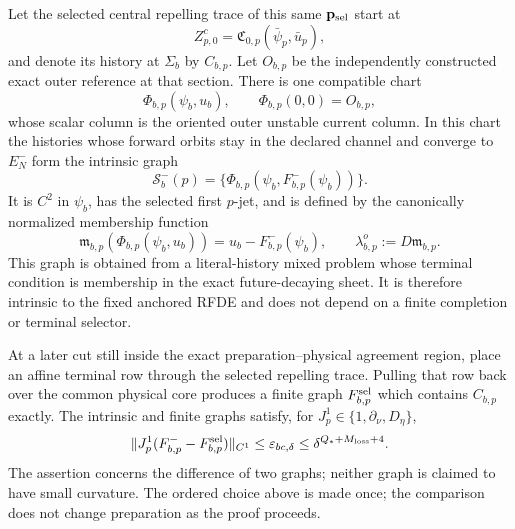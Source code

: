 \begin{proposition}
Let the selected central repelling trace of this same
\(\mathbf p_{\rm sel}\) start at
\begin{equation}
 Z^{c}_{p,0}
 =\mathfrak C_{0,p}(\bar\psi_p,\bar u_p),             \label{eq:anchor-reference-central-data}
\end{equation}
and denote its history at \(\Sigma_b\) by \(C_{b,p}\).  Let \(O_{b,p}\)
be the independently constructed exact outer reference at that section.
There is one compatible chart
\[
 \Phi_{b,p}(\psi_b,u_b),\qquad \Phi_{b,p}(0,0)=O_{b,p},
\]
whose scalar column is the oriented outer unstable current column.  In this
chart the histories whose forward orbits stay in the declared channel and
converge to \(E_N^-\) form the intrinsic graph
\begin{equation}
 \mathcal S_b^-(p)
 =\{\Phi_{b,p}(\psi_b,F_{b,p}^-(\psi_b))\}.           \label{eq:anchor-main-intrinsic-b-sheet}
\end{equation}
It is \(C^2\) in \(\psi_b\), has the selected first \(p\)-jet, and is
defined by the canonically normalized membership function
\begin{equation}
 \mathfrak m_{b,p}(\Phi_{b,p}(\psi_b,u_b))
 =u_b-F_{b,p}^-(\psi_b),\qquad
 \lambda_{b,p}^o:=D\mathfrak m_{b,p}.                \label{eq:anchor-main-b-membership}
\end{equation}
This graph is obtained from a literal-history mixed problem whose terminal
condition is membership in the exact future-decaying sheet.  It is therefore
intrinsic to the fixed anchored RFDE and does not depend on a finite
completion or terminal selector.

At a later cut still inside the exact preparation--physical agreement
region, place an affine terminal row through the selected repelling trace.
Pulling that row back over the common physical core produces a finite graph
\(F_{b,p}^{\rm sel}\) which contains \(C_{b,p}\) exactly.  The intrinsic
and finite graphs satisfy, for \(J_p^1\in\{1,\partial_\nu,D_\eta\}\),
\begin{equation}
 \|J_p^1(F_{b,p}^--F_{b,p}^{\rm sel})\|_{C^1}
 \le\varepsilon_{bc,\delta}\le\delta^{Q_*+M_{\rm loss}+4}.        \label{eq:anchor-main-finite-intrinsic-comparison}
\end{equation}
The assertion concerns the difference of two graphs; neither graph is
claimed to have small curvature.  The ordered choice above is made once;
the comparison does not change preparation as the proof proceeds.


\end{proposition}
